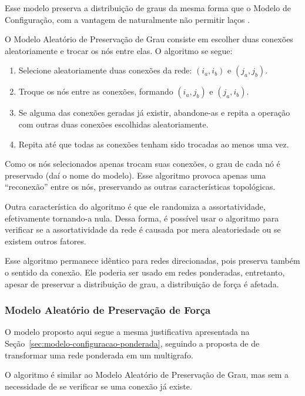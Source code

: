 \documentclass[12pt,a4paper]{article}
\theoremstyle{hypo}
\begin{document}
Esse modelo preserva a distribuição de graus da mesma forma que o Modelo de Configuração, com a vantagem de naturalmente não permitir laços \cite{Barabasi2016-rn}.

O Modelo Aleatório de Preservação de Grau consiste em escolher duas conexões aleatoriamente e trocar os nós entre elas. O algoritmo se segue:

\begin{enumerate}
\item Selecione aleatoriamente duas conexões da rede: $(i_a, i_b)$ e $(j_a, j_b)$.
\item Troque os nós entre as conexões, formando $(i_a, j_b)$ e $(j_a, i_b)$. 
\item Se alguma das conexões geradas já existir, abandone-as e repita a operação com outras duas conexões escolhidas aleatoriamente.
\item Repita até que todas as conexões tenham sido trocadas ao menos uma vez.
\end{enumerate}

Como os nós selecionados apenas trocam suas conexões, o grau de cada nó é preservado (daí o nome do modelo). Esse algoritmo provoca apenas uma \enquote{reconexão} entre os nós, preservando as outras características topológicas.

Outra característica do algoritmo é que ele randomiza a assortatividade, efetivamente tornando-a nula. Dessa forma, é possível usar o algoritmo para verificar se a assortatividade da rede é causada por mera aleatoriedade ou se existem outros fatores.

Esse algoritmo permanece idêntico para redes direcionadas, pois preserva também o sentido da conexão. Ele poderia ser usado em redes ponderadas, entretanto, apesar de preservar a distribuição de grau, a distribuição de força é afetada.

\subsubsection{Modelo Aleatório de Preservação de Força}

O modelo proposto aqui segue a mesma justificativa apresentada na Seção~\ref{sec:modelo-configuracao-ponderada}, seguindo a proposta de \cite{Newman2004-by} de transformar uma rede ponderada em um multigrafo.

O algoritmo é similar ao Modelo Aleatório de Preservação de Grau, mas sem a necessidade de se verificar se uma conexão já existe.
\end{document}
